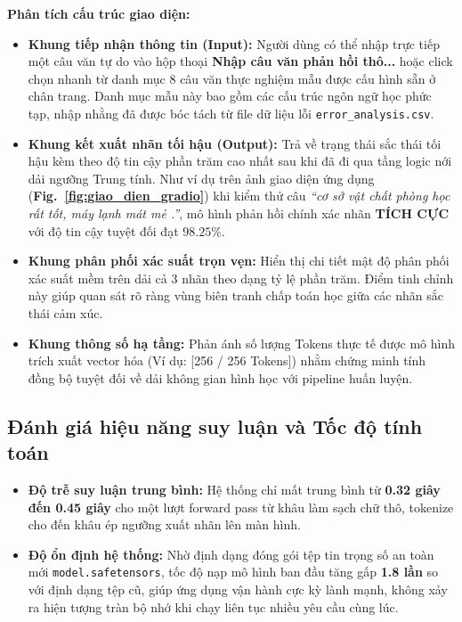 \documentclass[conference,10pt,a4paper]{IEEEtran}
\begin{document}
\noindent \textbf{Phân tích cấu trúc giao diện:}
\begin{itemize}
    \item \textbf{Khung tiếp nhận thông tin (Input):} Người dùng có thể nhập trực tiếp một câu văn tự do vào hộp thoại \textbf{Nhập câu văn phản hồi thô...} hoặc click chọn nhanh từ danh mục 8 câu văn thực nghiệm mẫu được cấu hình sẵn ở chân trang. Danh mục mẫu này bao gồm các cấu trúc ngôn ngữ học phức tạp, nhập nhằng đã được bóc tách từ file dữ liệu lỗi \texttt{error\_analysis.csv}.
    
    \item \textbf{Khung kết xuất nhãn tối hậu (Output):} Trả về trạng thái sắc thái tối hậu kèm theo độ tin cậy phần trăm cao nhất sau khi đã đi qua tầng logic nới dải ngưỡng Trung tính. Như ví dụ trên ảnh giao diện ứng dụng (\textbf{Fig.~\ref{fig:giao_dien_gradio}}) khi kiểm thử câu \textit{``cơ sở vật chất phòng học rất tốt, máy lạnh mát mẻ .''}, mô hình phản hồi chính xác nhãn \textbf{TÍCH CỰC} với độ tin cậy tuyệt đối đạt $98.25\%$.
    
    \item \textbf{Khung phân phối xác suất trọn vẹn:} Hiển thị chi tiết mật độ phân phối xác suất mềm trên dải cả 3 nhãn theo dạng tỷ lệ phần trăm. Điểm tinh chỉnh này giúp quan sát rõ ràng vùng biên tranh chấp toán học giữa các nhãn sắc thái cảm xúc.
    
    \item \textbf{Khung thông số hạ tầng:} Phản ánh số lượng Tokens thực tế được mô hình trích xuất vector hóa (Ví dụ: [256 / 256 Tokens]) nhằm chứng minh tính đồng bộ tuyệt đối về dải không gian hình học với pipeline huấn luyện.
\end{itemize}

\subsection{Đánh giá hiệu năng suy luận và Tốc độ tính toán}
\begin{itemize}
    \item \textbf{Độ trễ suy luận trung bình:} Hệ thống chỉ mất trung bình từ \textbf{0.32 giây đến 0.45 giây} cho một lượt forward pass từ khâu làm sạch chữ thô, tokenize cho đến khâu ép ngưỡng xuất nhãn lên màn hình.
    
    \item \textbf{Độ ổn định hệ thống:} Nhờ định dạng đóng gói tệp tin trọng số an toàn mới \texttt{model.safetensors}, tốc độ nạp mô hình ban đầu tăng gấp \textbf{1.8 lần} so với định dạng tệp cũ, giúp ứng dụng vận hành cực kỳ lành mạnh, không xảy ra hiện tượng tràn bộ nhớ khi chạy liên tục nhiều yêu cầu cùng lúc.
\end{itemize}
\end{document}
